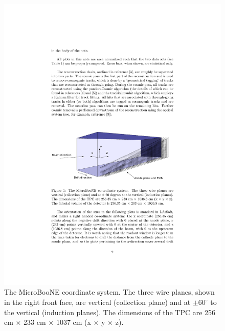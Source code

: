 \documentclass[a4paper,11pt]{article}
\begin{document}
\begin{figure}[htbp]
  \begin{center}
    \includegraphics[width=0.8\linewidth]{figures/coord.pdf}

    \caption{The MicroBooNE coordinate system. The three wire planes, shown in the right front face, are vertical (collection plane) and at  $\pm60^{\circ}$ to the vertical (induction planes). The dimensions of the TPC are 256 cm $\times$ 233 cm $\times$ 1037 cm (x $\times$ y $\times$ z).} \label{fig:coord}
  \end{center}
\end{figure}
\end{document}
